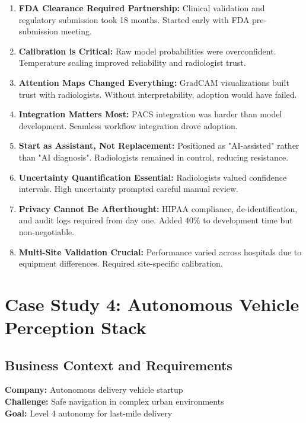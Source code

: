 \begin{enumerate}
    \item \textbf{FDA Clearance Required Partnership:} Clinical validation and regulatory submission took 18 months. Started early with FDA pre-submission meeting.

    \item \textbf{Calibration is Critical:} Raw model probabilities were overconfident. Temperature scaling improved reliability and radiologist trust.

    \item \textbf{Attention Maps Changed Everything:} GradCAM visualizations built trust with radiologists. Without interpretability, adoption would have failed.

    \item \textbf{Integration Matters Most:} PACS integration was harder than model development. Seamless workflow integration drove adoption.

    \item \textbf{Start as Assistant, Not Replacement:} Positioned as "AI-assisted" rather than "AI diagnosis". Radiologists remained in control, reducing resistance.

    \item \textbf{Uncertainty Quantification Essential:} Radiologists valued confidence intervals. High uncertainty prompted careful manual review.

    \item \textbf{Privacy Cannot Be Afterthought:} HIPAA compliance, de-identification, and audit logs required from day one. Added 40\% to development time but non-negotiable.

    \item \textbf{Multi-Site Validation Crucial:} Performance varied across hospitals due to equipment differences. Required site-specific calibration.
\end{enumerate}

\section{Case Study 4: Autonomous Vehicle Perception Stack}

\subsection{Business Context and Requirements}

\textbf{Company:} Autonomous delivery vehicle startup\\
\textbf{Challenge:} Safe navigation in complex urban environments\\
\textbf{Goal:} Level 4 autonomy for last-mile delivery

